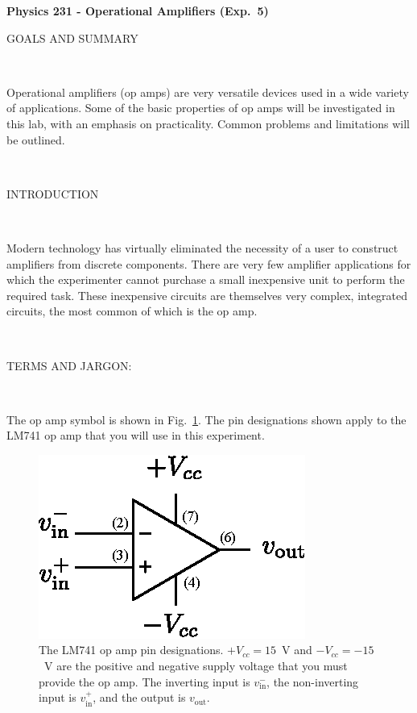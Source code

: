 \documentclass[12pt,oneside,openany,letterpaper]{article}
\begin{document}
\thispagestyle{plain}
\begin{center}
{\large{\bf{\selectfont Physics 231 - Operational Amplifiers (Exp.~5)}}}
\end{center}

\noindent GOALS AND SUMMARY

~

\noindent Operational amplifiers (op amps) are very versatile devices used in a wide variety of applications. Some of the basic properties of op amps will be investigated in this lab, with an emphasis on practicality. Common problems and limitations will be outlined. 

~

\noindent INTRODUCTION

~

\noindent Modern technology has virtually eliminated the necessity of a user to construct amplifiers from discrete components. There are very few amplifier applications for which the experimenter cannot purchase a small inexpensive unit to perform the required task. These inexpensive circuits are themselves very complex, integrated circuits, the most common of which is the op amp.

~

\noindent TERMS AND JARGON:

~
 
\noindent The op amp symbol is shown in Fig.~\ref{fig:1}.  The pin designations shown apply to the LM741 op amp that you will use in this experiment.
\begin{figure}[h!]
\begin{center}
\includegraphics[width=5.5 cm]{opamp.eps}
\caption{\label{fig:1}The LM741 op amp pin designations. $+V_{cc}=15$~V and $-V_{cc}=-15$~V are the positive and negative supply voltage that you must provide the op amp.  The inverting input is $v_\mathrm{in}^-$, the non-inverting input is $v_\mathrm{in}^+$, and the output is $v_\mathrm{out}$.}
\end{center}
\end{figure}

~
\end{document}
